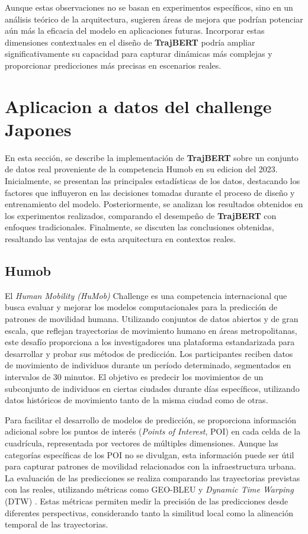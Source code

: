 Aunque estas observaciones no se basan en experimentos específicos, sino en un análisis teórico de la arquitectura, sugieren áreas de mejora que podrían potenciar aún más la eficacia del modelo en aplicaciones futuras. Incorporar estas dimensiones contextuales en el diseño de \textbf{TrajBERT} podría ampliar significativamente su capacidad para capturar dinámicas más complejas y proporcionar predicciones más precisas en escenarios reales.

\section{Aplicacion a datos del challenge Japones}

En esta sección, se describe la implementación de \textbf{TrajBERT} sobre un conjunto de datos real proveniente de la competencia Humob en su edicion del 2023. Inicialmente, se presentan las principales estadísticas de los datos, destacando los factores que influyeron en las decisiones tomadas durante el proceso de diseño y entrenamiento del modelo. Posteriormente, se analizan los resultados obtenidos en los experimentos realizados, comparando el desempeño de \textbf{TrajBERT} con enfoques tradicionales. Finalmente, se discuten las conclusiones obtenidas, resaltando las ventajas de esta arquitectura en contextos reales.

\subsection{Humob}

El \textit{Human Mobility (HuMob)}  Challenge es una competencia internacional que busca evaluar y mejorar los modelos computacionales para la predicción de patrones de movilidad humana. Utilizando conjuntos de datos abiertos y de gran escala, que reflejan trayectorias de movimiento humano en áreas metropolitanas, este desafío proporciona a los investigadores una plataforma estandarizada para desarrollar y probar sus métodos de predicción. Los participantes reciben datos de movimiento de individuos durante un período determinado, segmentados en intervalos de 30 minutos. El objetivo es predecir los movimientos de un subconjunto de individuos en ciertas ciudades durante días específicos, utilizando datos históricos de movimiento tanto de la misma ciudad como de otras.

Para facilitar el desarrollo de modelos de predicción, se proporciona información adicional sobre los puntos de interés (\textit{Points of Interest}, POI) en cada celda de la cuadrícula, representada por vectores de múltiples dimensiones. Aunque las categorías específicas de los POI no se divulgan, esta información puede ser útil para capturar patrones de movilidad relacionados con la infraestructura urbana. La evaluación de las predicciones se realiza comparando las trayectorias previstas con las reales, utilizando métricas como GEO-BLEU \cite{shimizu2022geo} y \textit{Dynamic Time Warping} (DTW) \cite{muller2007dynamic}. Estas métricas permiten medir la precisión de las predicciones desde diferentes perspectivas, considerando tanto la similitud local como la alineación temporal de las trayectorias. 

